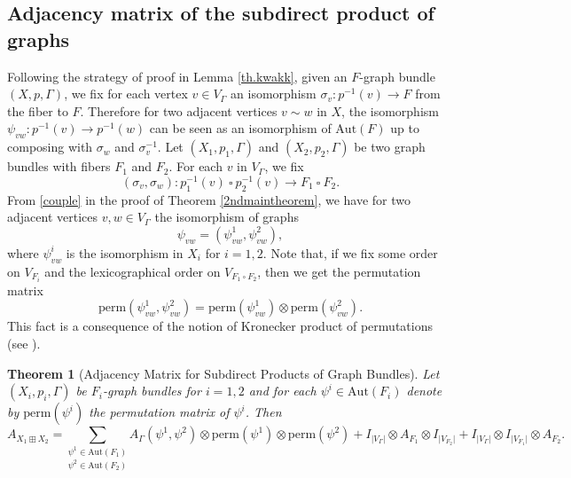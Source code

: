 \documentclass{amsart}
\newtheorem{thm}[theo]{Theorem}
\theoremstyle{definition}
\numberwithin{equation}{section}
\begin{document}
\subsection{Adjacency matrix of the subdirect product of graphs}
Following the strategy of proof in Lemma \ref{th.kwakk}, given an $F$-graph bundle $(X, p, \Gamma)$, we fix for each vertex $v \in V_\Gamma$ an isomorphism $\sigma_v: p^{-1}(v) \longrightarrow F$ from the fiber to $F$. Therefore for two adjacent vertices $v \sim w$ in $X$, the isomorphism $\psi_{vw}: p^{-1}(v) \longrightarrow p^{-1}(w)$ can be seen as an isomorphism of $\mathrm{Aut}(F)$ up to composing with $\sigma_w$ and $\sigma_v^{-1}$. 
Let $(X_1, p_1, \Gamma)$ and $(X_2, p_2, \Gamma)$ be two graph bundles with fibers $F_1$ and $F_2$. For each $v$ in $V_{\Gamma}$, we fix 
\begin{equation}
(\sigma_v,\sigma_w): p_1^{-1}(v)  \ \square  \ p_2^{-1}(v) \longrightarrow F_1 \  \square \  F_2.
\end{equation}
From  \eqref{couple} in the proof of Theorem \ref{2ndmaintheorem}, we have for two adjacent vertices $v, w \in V_\Gamma$ the isomorphism of graphs \begin{equation}\psi_{vw} = (\psi^1_{vw}, \psi^2_{vw}),\end{equation} where $\psi^i_{vw}$ is the isomorphism in $X_i$ for $i=1,2$. Note that, if we fix some order on $V_{F_i}$ and  the lexicographical order on $V_{F_1  \ \square  \ F_2}$, then we get the permutation matrix
\begin{equation}\label{perm.sp.}
\mathrm{perm}(\psi^1_{vw}, \psi^2_{vw}) = \mathrm{perm}(\psi^1_{vw}) \otimes \mathrm{perm}(\psi^2_{vw}).
\end{equation}
This fact is a consequence of the notion of Kronecker product of permutations (see \cite{spectrabook, crs, wang}).


\begin{thm}[Adjacency Matrix for Subdirect Products of Graph Bundles]\label{4thmaintheorem}
Let $(X_i, p_i, \Gamma)$ be  $F_i$-graph bundles for $i=1,2$ and for each $\psi^i \in \mathrm{Aut}(F_i)$ denote by $\mathrm{perm}(\psi^i)$ the permutation matrix of $\psi^i$. Then 
\begin{equation}
A_{X_1 \boxplus X_2} = {\underset{\psi^2 \in \mathrm{Aut}(F_2)}{\underset{\psi^1 \in \mathrm{Aut}(F_1)}\sum}} A_{\Gamma}(\psi^1, \psi^2) \otimes \mathrm{perm}(\psi^1) \otimes \mathrm{perm}(\psi^2) + I_{\vert V_{\Gamma} \vert} \otimes A_{F_1} \otimes I_{\vert V_{F_2} \vert } + I_{\vert V_{\Gamma} \vert} \otimes I_{\vert V_{F_1} \vert } \otimes A_{F_2}.
\end{equation}
\end{thm}
\end{document}
